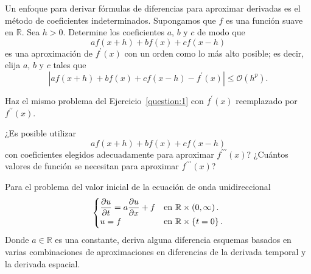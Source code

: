 \begin{questions}
	\question\label{question:1}

	Un enfoque para derivar fórmulas de diferencias para aproximar
	derivadas es el método de coeficientes indeterminados.
	Supongamos que $f$ es una función suave en $\mathbb{R}$.
	Sea $h>0$.
	Determine los coeficientes $a$, $b$ y $c$ de modo que
	\begin{equation*}
		af\left(x+h\right)+
		bf\left(x\right)+
		cf\left(x-h\right)
	\end{equation*}
	es una aproximación de $f^{\prime}\left(x\right)$ con un orden como
	lo más alto posible; es decir, elija $a$, $b$ y $c$ tales que
	\begin{equation*}
		\left|
		af\left(x+h\right)+bf\left(x\right)+
		cf\left(x-h\right)-f^{\prime}\left(x\right)
		\right|\leq
		\mathcal{O}\left(h^{p}\right).
	\end{equation*}

	\question

	Haz el mismo problema del Ejercicio~\ref{question:1} con
	$f^{\prime}\left(x\right)$ reemplazado por
	$f^{\prime\prime}\left(x\right)$.

	\question

	¿Es posible utilizar
	\begin{equation*}
		af\left(x+h\right)+
		bf\left(x\right)+
		cf\left(x-h\right)
	\end{equation*}
	con coeficientes elegidos adecuadamente para aproximar
	$f^{\prime\prime\prime}\left(x\right)$?
	¿Cuántos valores de función se necesitan para aproximar
	$f^{\prime\prime\prime}\left(x\right)$?


	\question\label{question:4}

	Para el problema del valor inicial de la ecuación de onda
	unidireccional
	\begin{equation}\label{eq:IVP-one-way-PDE}
		\begin{cases}\displaystyle
			\diffp{u}{t}=
			a\diffp{u}{x}+
			f   &
			\text{en }\mathbb{R}\times\left(0,\infty\right). \\
			u=f &
			\text{en }\mathbb{R}\times\left\{t=0\right\}.
		\end{cases}
	\end{equation}
	Donde $a\in\mathbb{R}$ es una constante, deriva alguna diferencia
	esquemas basados en varias combinaciones de aproximaciones en
	diferencias de la derivada temporal y la derivada espacial.


\end{questions}
